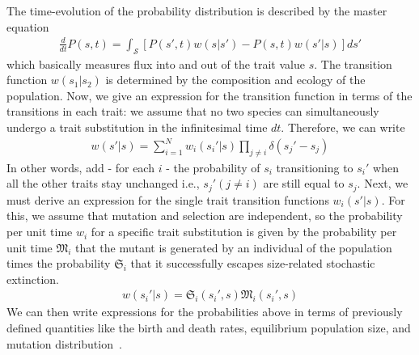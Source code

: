 The time-evolution of the probability distribution is described by the master equation
\begin{align}
	\frac{d}{dt}P(s,t) = \int_ \mathcal{S} [P(s',t)w(s|s') - P(s,t)w(s'|s)] ds'
\end{align}
which basically measures flux into and out of the trait value $s$. 
The transition function $w(s_1|s_2)$ is determined by the composition and ecology of the population. 
Now, we give an expression for the transition function in terms of the transitions in each trait: we assume that no two species can simultaneously undergo a trait substitution in the infinitesimal time $dt$. 
Therefore, we can write
\begin{align}
	w(s'|s) = \sum_{i=1}^N w_i(s_i'|s) \prod_{j \ne i} \delta(s_j'-s_j)
\end{align}
In other words, add - for each $i$ - the probability of $s_i$ transitioning to $s_i'$ when all the other traits stay unchanged i.e.,  $s_j' (j \ne i)$ are still equal to $s_j$.
Next, we must derive an expression for the single trait transition functions $w_i(s'|s)$.
For this, we assume that mutation and selection are independent, so the probability per unit time $w_i$ for a specific trait substitution is given by the probability per unit time $\mathfrak{M}_i$ that the mutant is generated by an individual of the population times the probability $\mathfrak{S}_i$ that it successfully escapes size-related stochastic extinction. 
\begin{align}
	w(s_i'|s) = \mathfrak{S}_i (s_i',s) \mathfrak{M}_i (s_i',s)
\end{align}
We can then write expressions for the probabilities above in terms of previously defined quantities like the birth and death rates, equilibrium population size, and mutation distribution~\citep{dieckmann_dynamical_1996}.

